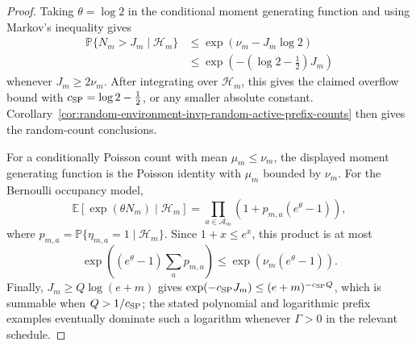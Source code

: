 \documentclass[11pt]{amsart}
\numberwithin{equation}{section}
\theoremstyle{definition}
\theoremstyle{remark}
\newcommand{\Prob}{\mathbb P}
\newcommand{\Exp}{\mathbb E}
\begin{document}
\begin{proof}
Taking \(\theta=\log2\) in the conditional moment generating function and using
Markov's inequality gives
\[
\begin{aligned}
  \Prob\{N_m>J_m\mid\mathcal H_m\}
  &\le
  \exp\!\left(\nu_m- J_m\log2\right)  \\
  &\le
  \exp\!\left(-(\log2-\tfrac12)J_m\right)
\end{aligned}
\]
whenever \(J_m\ge2\nu_m\).  After integrating over \(\mathcal H_m\), this gives
the claimed overflow bound with \(c_{\rm SP}=\log2-\tfrac12\), or any smaller
absolute constant.  Corollary~\ref{cor:random-environment-invp-random-active-prefix-counts}
then gives the random-count conclusions.

For a conditionally Poisson count with mean \(\mu_m\le\nu_m\), the displayed
moment generating function is the Poisson identity with \(\mu_m\) bounded by
\(\nu_m\).  For the Bernoulli occupancy model,
\[
  \Exp[\exp(\theta N_m)\mid\mathcal H_m]
  =
  \prod_{a\in\mathcal A_m}
  \left(1+p_{m,a}(e^\theta-1)\right),
\]
where \(p_{m,a}=\Prob\{\eta_{m,a}=1\mid\mathcal H_m\}\).  Since
\(1+x\le e^x\), this product is at most
\[
  \exp\!\left((e^\theta-1)\sum_a p_{m,a}\right)
  \le \exp\!\left(\nu_m(e^\theta-1)\right).
\]
Finally, \(J_m\ge Q\log(e+m)\) gives
\(\exp(-c_{\rm SP}J_m)\le(e+m)^{-c_{\rm SP}Q}\), which is summable when
\(Q>1/c_{\rm SP}\); the stated polynomial and logarithmic prefix examples
eventually dominate such a logarithm whenever \(\Gamma>0\) in the relevant
schedule.
\end{proof}
\end{document}
